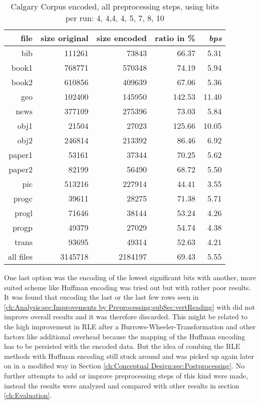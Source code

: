 {\par{
\begin{table}[h]
	\centering
	\begin{tabular}{r|r|r|r|r}	
		file & size original & size encoded & ratio in \% & \textit{bps}\\
		\hline
		bib & 111261 & 73843 & 66.37 & 5.31 \\
		book1 & 768771 & 570348 & 74.19 & 5.94 \\
		book2 & 610856 & 409639 & 67.06 & 5.36 \\
		geo & 102400 & 145950 & 142.53 & 11.40 \\
		news & 377109 & 275396 & 73.03 & 5.84 \\
		obj1 & 21504 & 27023 & 125.66 & 10.05 \\
		obj2 & 246814 & 213392 & 86.46 & 6.92 \\
		paper1 & 53161 & 37344 & 70.25 & 5.62 \\
		paper2 & 82199 & 56490 & 68.72 & 5.50 \\
		pic & 513216 & 227914 & 44.41 & 3.55 \\
		progc & 39611 & 28275 & 71.38 & 5.71 \\
		progl & 71646 & 38144 & 53.24 & 4.26 \\
		progp & 49379 & 27029 & 54.74 & 4.38 \\
		trans & 93695 & 49314 & 52.63 & 4.21 \\
		\hline
		all files & 3145718 & 2184197 & 69.43 & 5.55
	\end{tabular}
	\caption{Calgary Corpus encoded, all preprocessing steps, using bits per run: 4, 4,4, 4, 5, 7, 8, 10}
	\label{tab:t5:Calgary Corpus encoded, all preprocessing steps, using bits per run: 4, 4,4, 4, 5, 7, 8, 10}
\end{table}

\par{
One last option was the encoding of the lowest significant bits with another, more suited scheme like Huffman encoding was tried out but with rather poor results. It was found that encoding the last or the last few rows seen in \ref{ch:Analysis:sec:Improvements by Preprocessing:subSec:vertReading} with did not improve overall results and it was therefore discarded. This might be related to the high improvement in RLE after a Burrows-Wheeler-Transformation and other factors like additional overhead because the mapping of the Huffman encoding has to be persisted with the encoded data. But the idea of combing the RLE methods with Huffman encoding still stuck around and was picked up again later on in a modified way in Section \ref{ch:Conceptual Design:sec:Postprocessing}. No further attempts to add or improve preprocessing steps of this kind were made, instead the results were analyzed and compared with other results in section \ref{ch:Evaluation}.
}
}}
